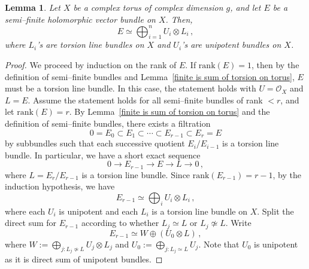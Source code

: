 \documentclass[12pt, reqno]{amsart}
\theoremstyle{plain}
\newtheorem{lemma}[theorem]{Lemma}
\numberwithin{equation}{section}
\begin{document}
\begin{lemma}\label{sf=f+u}
	Let $X$ be a complex torus of complex dimension $g$, and let $E$ be a semi--finite holomorphic vector bundle on $X$. Then, 
	$$E\simeq \bigoplus_{i=1}^n U_i \otimes L_i\,, $$
	where $L_i$'s are torsion line bundles on $X$ and $U_i$'s are unipotent bundles on $X$.
\end{lemma}
\begin{proof}
	We proceed by induction on the rank of \(E\). If \(\mathrm{rank}(E)=1\), then by the definition of semi--finite bundles and Lemma~\ref{finite is sum of torsion on torus}, \(E\) must be a torsion line bundle. In this case, the statement holds with \(U=\mathcal{O}_X\) and \(L=E\). Assume the statement holds for all semi--finite bundles of rank \(< r\), and let \(\mathrm{rank}(E)=r\). By Lemma~\ref{finite is sum of torsion on torus} and the definition of semi--finite bundles, there exists a filtration
	\[
	0 = E_0 \subset E_1 \subset \cdots \subset E_{r-1} \subset E_r = E
	\]
	by subbundles such that each successive quotient \(E_i/E_{i-1}\) is a torsion line bundle. In particular, we have a short exact sequence
	\begin{equation}\label{eq:main-sequence}
		0 \longrightarrow E_{r-1} \longrightarrow E \longrightarrow L \longrightarrow 0 \,,
	\end{equation}
	where \(L = E_r/E_{r-1}\) is a torsion line bundle. Since \(\mathrm{rank}(E_{r-1})=r-1\), by the induction hypothesis, we have
	\[
	E_{r-1} \simeq \bigoplus_i U_i \otimes L_i \,,
	\]
	where each \(U_i\) is unipotent and each \(L_i\) is a torsion line bundle on \(X\). Split the direct sum for $E_{r-1}$ according to whether $L_j\simeq L$ or $L_j \not \simeq L$. Write
	$$E_{r-1} \simeq W \oplus (U_0 \otimes L) \,,$$
	where $W:= \bigoplus_{j:L_j \not \simeq L} U_j \otimes L_j$ and $U_0:= \bigoplus_{j:L_j \simeq L} U_j$. Note that $U_0$ is unipotent as it is direct sum of unipotent bundles.
	

\end{proof}
\end{document}
